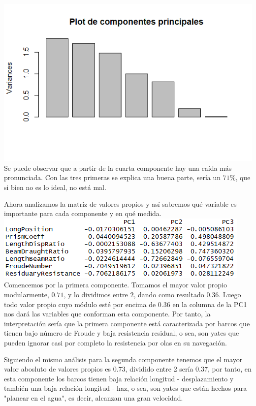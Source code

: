 \documentclass[twoside]{article}
\begin{document}
\begin{multicols}{2}
\includegraphics[scale = 0.4]{images/pic_24.png} \\

Se puede observar que a partir de la cuarta componente hay una ca\'ida m\'as pronunciada. Con las tres primeras se explica una buena parte, ser\'ia un $71\%$, que si bien no es lo ideal, no est\'a mal.

Ahora analizamos la matriz de valores propios y as\'i sabremos qu\'e variable es importante para cada componente y en qu\'e medida.\\

\includegraphics[scale = 0.5]{images/pic_25.png} \\

Comencemos por la primera componente. Tomamos el mayor valor propio modularmente, $0.71$, y lo dividimos entre $2$, dando como resultado $0.36$. Luego todo valor propio cuyo m\'odulo est\'e por encima de $0.36$ en la columna de la PC1 nos dar\'a las variables que conforman esta componente. Por tanto, la interpretaci\'on ser\'ia que la primera componente est\'a caracterizada por barcos que tienen bajo n\'umero de Froude y baja resistencia residual, o sea, son yates que pueden ignorar casi por completo la resistencia por olas en su navegaci\'on. 

Siguiendo el mismo an\'alisis para la segunda componente tenemos que el mayor valor abosluto de valores propios es $0.73$, dividido entre 2 ser\'ia $0.37$, por tanto, en esta componente los barcos tienen baja relaci\'on longitud - desplazamiento y tambi\'en una baja relaci\'on longitud - haz, o sea, son yates que est\'an hechos para "planear en el agua", es decir, alcanzan una gran velocidad. 


\end{multicols}
\end{document}
